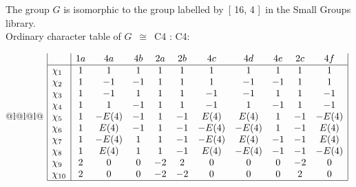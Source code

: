 \documentclass[varwidth=\maxdimen,border=10]{standalone}
\begin{document}
The group $G$ is isomorphic to the group labelled by\ [ 16, 4 ]\ in the Small Groups library.\\
Ordinary character table of $G$\ $\cong$\ C4 : C4:\\
\begin{center}
\begin{tabular}{@{}l@{}l@{}l@{}}
\hline
\(\begin{array}{|l|cccccccccc|}
  & 1a & 4a & 4b & 2a & 2b & 4c & 4d & 4e & 2c & 4f\\ \hline
\chi_{1} & 1 & 1 & 1 & 1 & 1 & 1 & 1 & 1 & 1 & 1\\
\chi_{2} & 1 & -1 & -1 & 1 & 1 & 1 & -1 & -1 & 1 & 1\\
\chi_{3} & 1 & -1 & 1 & 1 & 1 & -1 & -1 & 1 & 1 & -1\\
\chi_{4} & 1 & 1 & -1 & 1 & 1 & -1 & 1 & -1 & 1 & -1\\
\chi_{5} & 1 & -E(4) & -1 & 1 & -1 & E(4) & E(4) & 1 & -1 & -E(4)\\
\chi_{6} & 1 & E(4) & -1 & 1 & -1 & -E(4) & -E(4) & 1 & -1 & E(4)\\
\chi_{7} & 1 & -E(4) & 1 & 1 & -1 & -E(4) & E(4) & -1 & -1 & E(4)\\
\chi_{8} & 1 & E(4) & 1 & 1 & -1 & E(4) & -E(4) & -1 & -1 & -E(4)\\
\chi_{9} & 2 & 0 & 0 & -2 & 2 & 0 & 0 & 0 & -2 & 0\\
\chi_{10} & 2 & 0 & 0 & -2 & -2 & 0 & 0 & 0 & 2 & 0\\
\hline
\end{array}\)\\
\end{tabular}
\end{center}
\end{document}
